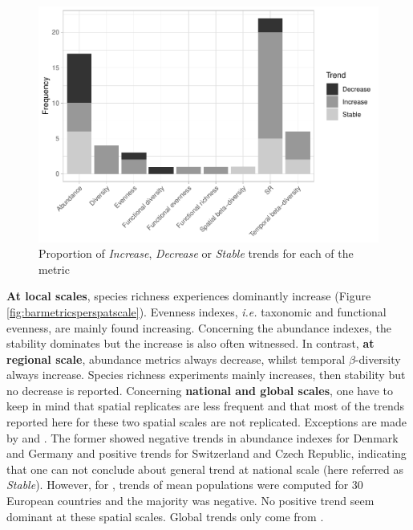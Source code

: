 \documentclass[
  12pt,
  oneside]{report}
\begin{document}
\begin{figure}
\centering
\includegraphics{literature_review_files/figure-latex/barmetrics-1.pdf}
\caption{\label{fig:barmetrics}Proportion of \emph{Increase}, \emph{Decrease} or \emph{Stable} trends for each of the metric}
\end{figure}

\textbf{At local scales}, species richness experiences dominantly increase (Figure \ref{fig:barmetricsperspatscale}). Evenness indexes, \emph{i.e.} taxonomic and functional evenness, are mainly found increasing. Concerning the abundance indexes, the stability dominates but the increase is also often witnessed. In contrast, \textbf{at regional scale}, abundance metrics always decrease, whilst temporal \(\beta\)-diversity always increase. Species richness experiments mainly increases, then stability but no decrease is reported. Concerning \textbf{national and global scales}, one have to keep in mind that spatial replicates are less frequent and that most of the trends reported here for these two spatial scales are not replicated. Exceptions are made by \textcite{bowler_geographic_2021} and \textcite{donald_agricultural_2001}. The former showed negative trends in abundance indexes for Denmark and Germany and positive trends for Switzerland and Czech Republic, indicating that one can not conclude about general trend at national scale (here referred as \emph{Stable}). However, for \textcite{donald_agricultural_2001}, trends of mean populations were computed for 30 European countries and the majority was negative. No positive trend seem dominant at these spatial scales. Global trends only come from \textcite{jarzyna_taxonomic_2018}.
\end{document}
